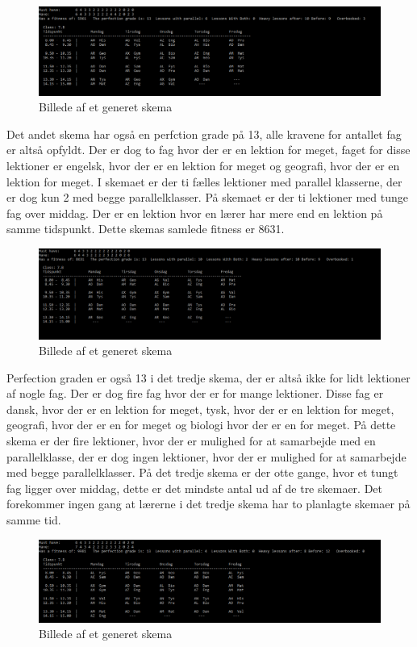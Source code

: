 \begin{figure}[!h]
\includegraphics[width=\textwidth]{partials/graphics/fitness1.png}
\caption{Billede af et generet skema}
\label{fitness1}
\end{figure}

Det andet skema har også en perfction grade på 13, alle kravene for antallet fag er altså opfyldt. Der er dog to fag hvor der er en lektion for meget, faget for disse lektioner er engelsk, hvor der er en lektion for meget og geografi, hvor der er en lektion for meget. I skemaet er der ti fælles lektioner med parallel klasserne, der er dog kun 2 med begge parallelklasser. På skemaet er der ti lektioner med tunge fag over middag. Der er en lektion hvor en lærer har mere end en lektion på samme tidspunkt. Dette skemas samlede fitness er 8631.
\begin{figure}[!h]
\includegraphics[width=\textwidth]{partials/graphics/fitness2.png}
\caption{Billede af et generet skema}
\label{fitness2}
\end{figure}

Perfection graden er også 13 i det tredje skema, der er altså ikke for lidt lektioner af nogle fag. Der er dog fire fag hvor der er for mange lektioner. Disse fag er dansk, hvor der er en lektion for meget, tysk, hvor der er en lektion for meget, geografi, hvor der er en for meget og biologi hvor der er en for meget. På dette skema er der fire lektioner, hvor der er mulighed for at samarbejde med en parallelklasse, der er dog ingen lektioner, hvor der er mulighed for at samarbejde med begge parallelklasser. På det tredje skema er der otte gange, hvor et tungt fag ligger over middag, dette er det mindste antal ud af de tre skemaer. Det forekommer ingen gang at lærerne i det tredje skema har to planlagte skemaer på samme tid. 
\begin{figure}[!h]
\includegraphics[width=\textwidth]{partials/graphics/fitness3.png}
\caption{Billede af et generet skema}
\label{fitness3}
\end{figure}

